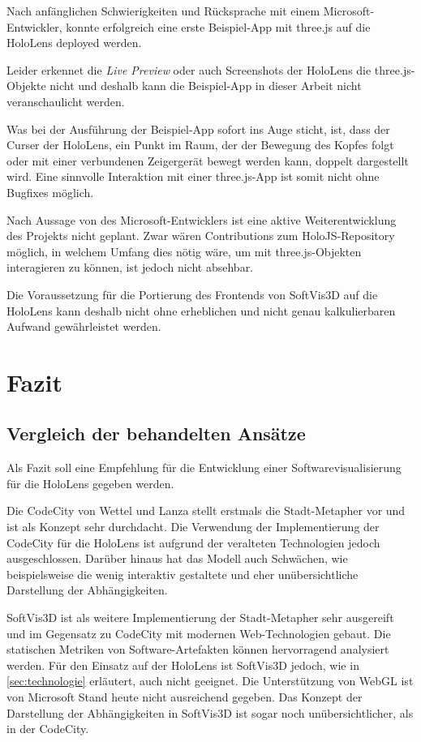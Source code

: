 Nach anfänglichen Schwierigkeiten und Rücksprache mit einem Microsoft-Entwickler, konnte erfolgreich eine erste Beispiel-App mit three.js auf die HoloLens deployed werden.

Leider erkennet die \textit{Live Preview} oder auch Screenshots der HoloLens die three.js-Objekte nicht und deshalb kann die Beispiel-App in dieser Arbeit nicht veranschaulicht werden.

Was bei der Ausführung der Beispiel-App sofort ins Auge sticht, ist, dass der Curser der HoloLens, ein Punkt im Raum, der der Bewegung des Kopfes folgt oder mit einer verbundenen Zeigergerät bewegt werden kann, doppelt dargestellt wird. Eine sinnvolle Interaktion mit einer three.js-App ist somit nicht ohne Bugfixes möglich.

Nach Aussage von des Microsoft-Entwicklers ist eine aktive Weiterentwicklung des Projekts nicht geplant. Zwar wären Contributions zum HoloJS-Repository möglich, in welchem Umfang dies nötig wäre, um mit three.js-Objekten interagieren zu können, ist jedoch nicht absehbar.

Die Voraussetzung für die Portierung des Frontends von SoftVis3D auf die HoloLens kann deshalb nicht ohne erheblichen und nicht genau kalkulierbaren Aufwand gewährleistet werden.


\section{Fazit}
\subsection{Vergleich der behandelten Ansätze}
Als Fazit soll eine Empfehlung für die Entwicklung einer Softwarevisualisierung für die HoloLens gegeben werden.

Die CodeCity von Wettel und Lanza stellt erstmals die Stadt-Metapher vor und ist als Konzept sehr durchdacht. Die Verwendung der Implementierung der CodeCity für die HoloLens ist aufgrund der veralteten Technologien jedoch ausgeschlossen. Darüber hinaus hat das Modell auch Schwächen, wie beispielsweise die wenig interaktiv gestaltete und eher unübersichtliche Darstellung der Abhängigkeiten.

SoftVis3D ist als weitere Implementierung der Stadt-Metapher sehr ausgereift und im Gegensatz zu CodeCity mit modernen Web-Technologien gebaut. Die statischen Metriken von Software-Artefakten können hervorragend analysiert werden. Für den Einsatz auf der HoloLens ist SoftVis3D jedoch, wie in \ref{sec:technologie} erläutert, auch nicht geeignet. Die Unterstützung von WebGL ist von Microsoft Stand heute nicht ausreichend gegeben. Das Konzept der Darstellung der Abhängigkeiten in SoftVis3D ist sogar noch unübersichtlicher, als in der CodeCity.

